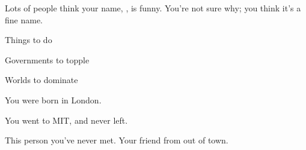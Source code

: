 \documentclass[char]{guildcamp3}
\begin{document}
Lots of people think your name, \me{\intro}, is funny.  You're not
sure why; you think it's a fine name.



\begin{itemz}[Goals]
  \item Things to do
  \item Governments to topple
  \item Worlds to dominate
\end{itemz}

\begin{itemz}[Notes]
  \item You were born in London.
  \item You went to MIT, and never left.
\end{itemz}


\begin{contacts}
  \contact{\cNPC{}} This person you've never met.
  \contact{\cSomeGuy{}} Your friend from out of town.
\end{contacts}
\end{document}

